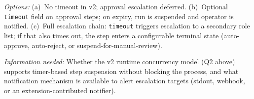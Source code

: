 \begin{enumerate}[label=\textbf{Q\arabic*.}]
    \textit{Options:} (a)~No timeout in v2; approval escalation deferred. (b)~Optional
    \texttt{timeout} field on approval steps; on expiry, run is suspended and operator is notified.
    (c)~Full escalation chain: \texttt{timeout} triggers escalation to a secondary role list; if that
    also times out, the step enters a configurable terminal state (auto-approve, auto-reject, or
    suspend-for-manual-review).

    \textit{Information needed:} Whether the v2 runtime concurrency model (Q2 above) supports
    timer-based step suspension without blocking the process, and what notification mechanism is
    available to alert escalation targets (stdout, webhook, or an extension-contributed notifier).

\end{enumerate}
